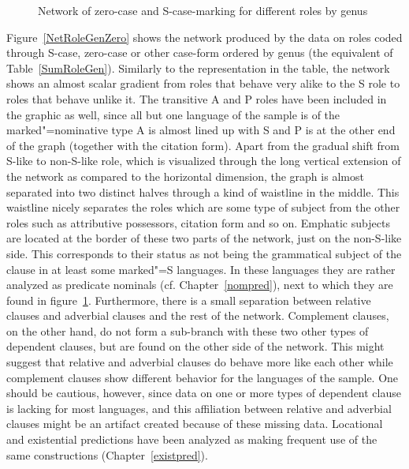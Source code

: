 \begin{figure}[h,t,b,p] \centering {}%
\caption{Network of zero-case and S-case-marking for different roles by genus}\label{NetRoleGenZero}
\end{figure}


Figure~\vref{NetRoleGenZero} shows the network produced by the data on roles coded through S-case, zero-case or other case-form ordered by genus (the equivalent of Table~\ref{SumRoleGen}). 
Similarly to the representation in the table, the network shows an almost scalar gradient from roles that behave very alike to the S role to roles that behave unlike it.
The transitive A and P roles have been included in the graphic as well, since all but one language of the sample is of the marked"=nominative type A is almost lined up with S and P is at the other end of the graph (together with the citation form). 
Apart from the gradual shift from S-like to non-S-like role, which is visualized through the long vertical extension of the network as compared to the horizontal dimension, the graph is almost separated into two distinct halves through a kind of waistline in the middle. 
This waistline nicely separates the roles which are some type of subject from the other roles such as attributive possessors, citation form and so on. 
Emphatic subjects are located at the border of these two parts of the network, just on the non-S-like side. 
This corresponds to their status as not being the grammatical subject of the clause in at least some marked"=S languages. 
In these languages they are rather analyzed as predicate nominals (cf. Chapter~\ref{nompred}), next to which they are found in figure~\ref{NetRoleGenZero}. 
Furthermore, there is a small separation between relative clauses and adverbial clauses and the rest of the network. 
Complement clauses, on the other hand, do not form a sub-branch with these two other types of dependent clauses, but are found on the other side of the network. 
This might suggest that relative and adverbial clauses do behave more like each other while complement clauses show different behavior for the languages of the sample. 
One should be cautious, however, since data on one or more types of dependent clause is lacking for most languages, and this affiliation between relative and adverbial clauses might be an artifact created because of these missing data.
Locational and existential predictions have been analyzed as making frequent use of the same constructions (Chapter~\ref{existpred}). 
